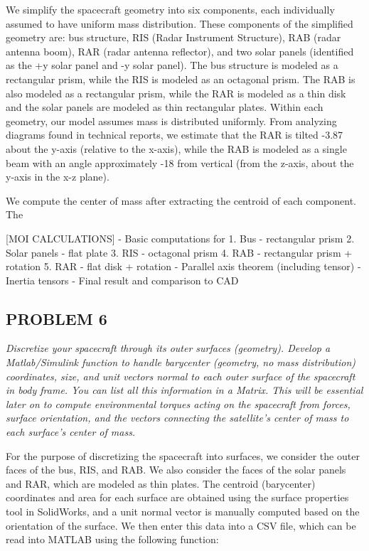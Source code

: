 We simplify the spacecraft geometry into six components, each individually assumed to have uniform mass distribution. These components of the simplified geometry are: bus structure, RIS (Radar Instrument Structure), RAB (radar antenna boom), RAR (radar antenna reflector), and two solar panels (identified as the +y solar panel and -y solar panel). The bus structure is modeled as a rectangular prism, while the RIS is modeled as an octagonal prism. The RAB is also modeled as a rectangular prism, while the RAR is modeled as a thin disk and the solar panels are modeled as thin rectangular plates. Within each geometry, our model assumes mass is distributed uniformly. From analyzing diagrams found in technical reports, we estimate that the RAR is tilted -3.87\degree{} about the y-axis (relative to the x-axis), while the RAB is modeled as a single beam with an angle approximately -18\degree{} from vertical (from the z-axis, about the y-axis in the x-z plane).

We compute the center of mass after extracting the centroid of each component. The

[MOI CALCULATIONS]
- Basic computations for
    1. Bus - rectangular prism
    2. Solar panels - flat plate
    3. RIS - octagonal prism
    4. RAB - rectangular prism + rotation
    5. RAR - flat disk + rotation
- Parallel axis theorem (including tensor)
- Inertia tensors
- Final result and comparison to CAD

\subsection{PROBLEM 6}
\textit{Discretize your spacecraft through its outer surfaces (geometry). Develop a Matlab/Simulink function to handle barycenter (geometry, no mass distribution) coordinates, size, and unit vectors normal to each outer surface of the spacecraft in body frame. You can list all this information in a Matrix. This will be essential later on to compute environmental torques acting on the spacecraft from forces, surface orientation, and the vectors connecting the satellite’s center of mass to each surface’s center of mass.}

For the purpose of discretizing the spacecraft into surfaces, we consider the outer faces of the bus, RIS, and RAB. We also consider the faces of the solar panels and RAR, which are modeled as thin plates. The centroid (barycenter) coordinates and area for each surface are obtained using the surface properties tool in SolidWorks, and a unit normal vector is manually computed based on the orientation of the surface. We then enter this data into a CSV file, which can be read into MATLAB using the following function:

